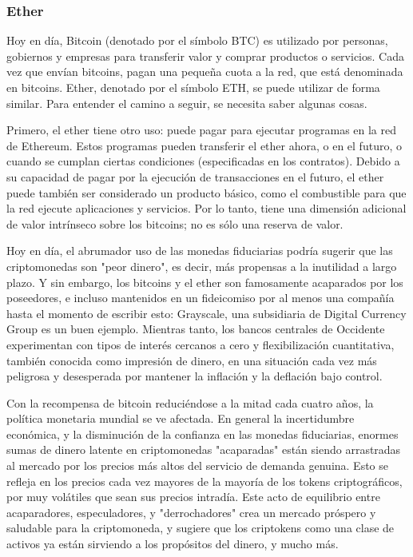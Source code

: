 \subsubsection{Ether}
Hoy en día, Bitcoin (denotado por el símbolo BTC) es utilizado por personas, gobiernos y empresas
para transferir valor y comprar productos o servicios. Cada vez que envían bitcoins, pagan una
pequeña cuota a la red, que está denominada en bitcoins. Ether, denotado por el símbolo ETH, se
puede utilizar de forma similar. Para entender el camino a seguir, se necesita saber algunas cosas.

Primero, el ether tiene otro uso: puede pagar para ejecutar programas en la red de Ethereum.
Estos programas pueden transferir el ether ahora, o en el futuro, o cuando se cumplan ciertas
condiciones (especificadas en los contratos).
Debido a su capacidad de pagar por la ejecución de transacciones en el futuro, el ether puede
también ser considerado un producto básico, como el combustible para que la red ejecute
aplicaciones y servicios. Por lo tanto, tiene una dimensión adicional de valor intrínseco sobre los
bitcoins; no es sólo una reserva de valor.

Hoy en día, el abrumador uso de las monedas fiduciarias podría sugerir que
las criptomonedas son "peor dinero", es decir, más propensas a la inutilidad a largo plazo.
Y sin embargo, los bitcoins y el ether son famosamente acaparados por los poseedores, e incluso
mantenidos en un fideicomiso por al menos una compañía hasta el momento de escribir esto:
Grayscale, una subsidiaria de Digital Currency Group es un buen ejemplo.
Mientras tanto, los bancos centrales de Occidente experimentan con tipos de interés cercanos a cero
y flexibilización cuantitativa, también conocida como impresión de dinero, en una situación cada
vez más peligrosa y desesperada por mantener la inflación y la deflación bajo control.

Con la recompensa de bitcoin reduciéndose a la mitad cada cuatro años, la política monetaria
mundial se ve afectada. En general la incertidumbre económica, y la disminución de la confianza en
las monedas fiduciarias, enormes sumas de dinero latente en criptomonedas "acaparadas" están siendo
arrastradas al mercado por los precios más altos del servicio de demanda genuina. Esto se refleja
en los precios cada vez mayores de la mayoría de los tokens criptográficos, por muy volátiles que
sean sus precios intradía. Este acto de equilibrio entre acaparadores, especuladores, y
"derrochadores" crea un mercado próspero y saludable para la criptomoneda, y sugiere que
los criptokens como una clase de activos ya están sirviendo a los propósitos del dinero, y mucho
más.

